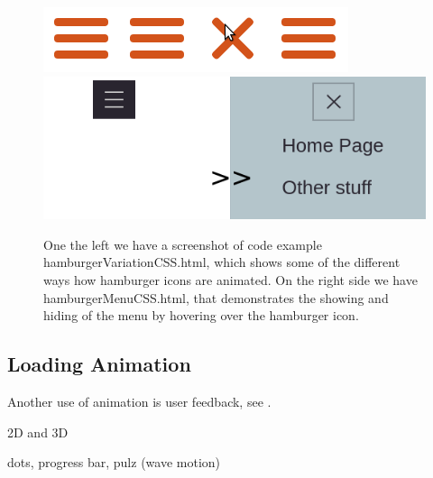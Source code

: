 \begin{figure}[tp]
\centering
\includegraphics[keepaspectratio,scale=0.5]{images/hamburgerVar.png}
\includegraphics[keepaspectratio,scale=0.5]{images/hamburgerMenu.png}

\caption[Hamburger Examples]{
One the left we have a screenshot of code example hamburgerVariationCSS.html, which shows some of the different ways how hamburger icons are animated. On the right side we have hamburgerMenuCSS.html, that demonstrates the showing and hiding of the menu by hovering over the hamburger icon.
}
\label{fig:hamburger}
\end{figure}



\label{subsub:menu}


\subsection{Loading Animation} %
\label{sub:loadingCSS}

Another use of animation is user feedback, see .

\label{subsub:rotation_loader}
2D and 3D

\label{subsub:menu}

dots, progress bar, pulz (wave motion)

